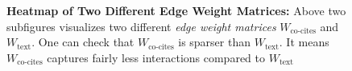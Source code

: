 \begin{figure}[ht]
    \begin{subfigure}[b]{0.49\textwidth}
    \end{subfigure}
    \hfill
    \begin{subfigure}[b]{0.49\textwidth}
    \end{subfigure}
    \label{fig:sparse_dense}
    \vfill
    \centering{
        
    }
    \caption{\textbf{Heatmap of Two Different Edge Weight Matrices: }Above two subfigures visualizes two different \textit{edge weight matrices} $W_{\text{co-cites}}$ and $W_{\text{text}}$. One can check that $W_{\text{co-cites}}$ is sparser than $W_{\text{text}}$. It means $W_\text{co-cites}$ captures fairly less interactions compared to $W_\text{text}$}
    \label{fig:heatmap:edgeweights:compare}
\end{figure}

